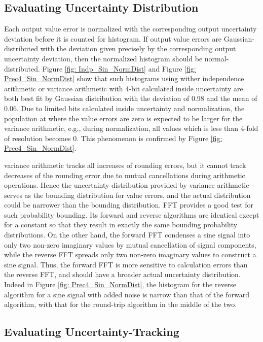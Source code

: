 \documentclass[twoside]{article}
\numberwithin{equation}{section}
\begin{document}
\subsection{Evaluating Uncertainty Distribution}

Each output value error is normalized with the corresponding output uncertainty deviation before it is counted for histogram. If output value errors are Gaussian-distributed with the deviation given precisely by the corresponding output uncertainty deviation, then the normalized histogram should be normal-distributed.  Figure \ref{fig: Indp_Sin_NormDist} and Figure \ref{fig: Prec4_Sin_NormDist} show that such histograms using wither independence arithmetic or variance arithmetic with 4-bit calculated inside uncertainty are both best fit by Gaussian distribution with the deviation of 0.98 and the mean of 0.06.  Due to limited bits calculated inside uncertainty and normalization, the population at where the value errors are zero is expected to be larger for the variance arithmetic, e.g., during normalization, all values which is less than 4-fold of resolution becomes 0. This phenomenon is confirmed by Figure \ref{fig: Prec4_Sin_NormDist}.

variance arithmetic tracks all increases of rounding errors, but it cannot track decreases of the rounding error due to mutual cancellations during arithmetic operations.  Hence the uncertainty distribution provided by variance arithmetic serves as the bounding distribution for value errors, and the actual distribution could be narrower than the bounding distribution.  FFT provides a good test for such probability bounding.  Its forward and reverse algorithms are identical except for a constant so that they result in exactly the same bounding probability distributions.  On the other hand, the forward FFT condenses a sine signal into only two non-zero imaginary values by mutual cancellation of signal components, while the reverse FFT spreads only two non-zero imaginary values to construct a sine signal.  Thus, the forward FFT is more sensitive to calculation errors than the reverse FFT, and should have a broader actual uncertainty distribution.  Indeed in Figure \ref{fig: Prec4_Sin_NormDist}, the histogram for the reverse algorithm for a sine signal with added noise is narrow than that of the forward algorithm, with that for the round-trip algorithm in the middle of the two.



\subsection{Evaluating Uncertainty-Tracking}
\end{document}
